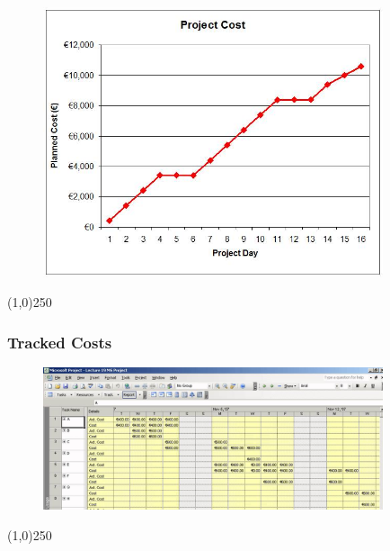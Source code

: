 \begin{frame}
\frametitle{}
\begin{figure}
	\centering
		\includegraphics[width = 10cm]{images/costprofile.jpg}
	\label{fig:costprofile}
\end{figure}

\end{frame}
\begin{center}\line(1,0){250}\end{center}






\begin{frame}
\frametitle{Tracked Costs}
\begin{figure}
	\centering
		\includegraphics[width = 10cm]{images/costtrack.jpg}
	\label{fig:costtrack}
\end{figure}
\end{frame}
\begin{center}\line(1,0){250}\end{center}






